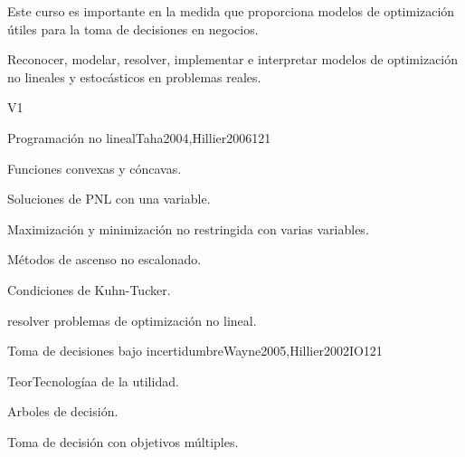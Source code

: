 \begin{syllabus}


\begin{justification}
   Este curso es importante en la medida que proporciona modelos de optimización útiles para la toma de decisiones en negocios.
   \end{justification}
   
   \begin{goals}
   \item Reconocer, modelar, resolver, implementar e interpretar modelos de optimización no lineales y estocásticos en problemas reales.
   \end{goals}
   
   \begin{outcomes}{V1}
      \item {}
      \item {}
      \item {}
      \item {}
      \item {}
   \end{outcomes}
   
   \begin{unit}{Programación no lineal}{}{Taha2004,Hillier2006}{12}{1}
      \begin{topics}
         \item Funciones convexas y cóncavas.
         \item Soluciones de PNL con una variable.
         \item Maximización y minimización no restringida con varias variables.
         \item Métodos de ascenso no escalonado.
         \item Condiciones de Kuhn-Tucker.
      \end{topics}
   
      \begin{learningoutcomes}
         \item resolver problemas de optimización no lineal.
      \end{learningoutcomes}
   \end{unit}
   
   \begin{unit}{Toma de decisiones bajo incertidumbre}{}{Wayne2005,Hillier2002IO}{12}{1}
      \begin{topics}
         \item TeorTecnologíaa de la utilidad.
         \item Arboles de decisión.
         \item Toma de decisión con objetivos múltiples.
      \end{topics}
   

\end{unit}
\end{syllabus}
